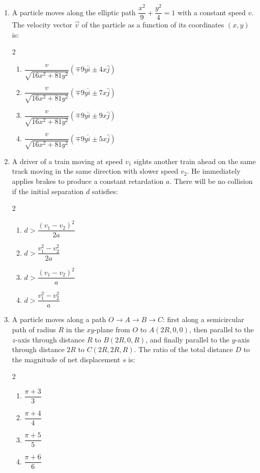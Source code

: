 \documentclass[11pt,a4paper]{article}
\begin{document}
\begin{enumerate}[label=\textbf{\textcolor{l3Crimson}{Q\arabic*.}},leftmargin=24pt,itemsep=10pt,start=51]
  \item A particle moves along the elliptic path $\dfrac{x^2}{9} + \dfrac{y^2}{4} = 1$ with a constant speed $v$. The velocity vector $\vec{v}$ of the particle as a function of its coordinates $(x, y)$ is:
  \begin{multicols}{2}
  \begin{enumerate}[label=\textbf{\textcolor{primaryDark}{(\Alph*)}},itemsep=2pt]
    \item $\dfrac{v}{\sqrt{16x^2 + 81y^2}}\left(\mp 9y \hat{i} \pm 4x \hat{j}\right)$
    \item $\dfrac{v}{\sqrt{16x^2 + 81y^2}}\left(\mp 9y \hat{i} \pm 7x \hat{j}\right)$
    \item $\dfrac{v}{\sqrt{16x^2 + 81y^2}}\left(\mp 9y \hat{i} \pm 9x \hat{j}\right)$
    \item $\dfrac{v}{\sqrt{16x^2 + 81y^2}}\left(\mp 9y \hat{i} \pm 5x \hat{j}\right)$
  \end{enumerate}
  \end{multicols}

  \item A driver of a train moving at speed $v_1$ sights another train ahead on the same track moving in the same direction with slower speed $v_2$. He immediately applies brakes to produce a constant retardation $a$. There will be no collision if the initial separation $d$ satisfies:
  \begin{multicols}{2}
  \begin{enumerate}[label=\textbf{\textcolor{primaryDark}{(\Alph*)}},itemsep=2pt]
    \item $d > \dfrac{(v_1 - v_2)^2}{2a}$
    \item $d > \dfrac{v_1^2 - v_2^2}{2a}$
    \item $d > \dfrac{(v_1 - v_2)^2}{a}$
    \item $d > \dfrac{v_1^2 - v_2^2}{a}$
  \end{enumerate}
  \end{multicols}

  \item A particle moves along a path $O \to A \to B \to C$: first along a semicircular path of radius $R$ in the $xy$-plane from $O$ to $A(2R, 0, 0)$, then parallel to the $z$-axis through distance $R$ to $B(2R, 0, R)$, and finally parallel to the $y$-axis through distance $2R$ to $C(2R, 2R, R)$. The ratio of the total distance $D$ to the magnitude of net displacement $s$ is:
  \begin{multicols}{2}
  \begin{enumerate}[label=\textbf{\textcolor{primaryDark}{(\Alph*)}},itemsep=2pt]
    \item $\dfrac{\pi + 3}{3}$
    \item $\dfrac{\pi + 4}{4}$
    \item $\dfrac{\pi + 5}{5}$
    \item $\dfrac{\pi + 6}{6}$
  \end{enumerate}
  \end{multicols}


\end{enumerate}
\end{document}
